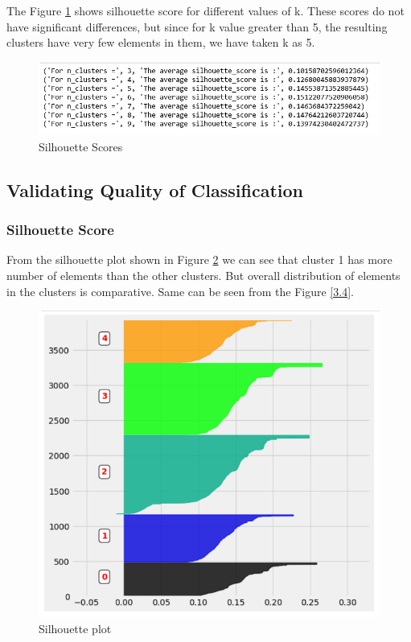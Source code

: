 The Figure \ref{3.2} shows silhouette score for different values of k. These scores do not have significant differences, but since for k value greater than 5, the resulting clusters have very few elements in them, we have taken k as 5. 

\begin{figure}[H]
\caption{Silhouette Scores}
\label{3.2}
\centering
\includegraphics[width=\columnwidth]{images/3_2.PNG}
\end{figure}

\subsection{Validating Quality of Classification}

\subsubsection{\textbf{Silhouette Score}}

From the silhouette plot shown in Figure \ref{3.3} we can see that cluster 1 has more number of elements than the other clusters. But overall distribution of elements in the clusters is comparative. Same can be seen from the Figure \ref{3.4}.

\begin{figure}
\caption{Silhouette plot}
\label{3.3}
\centering
\includegraphics[width=\columnwidth]{images/3_3.PNG}
\end{figure}


